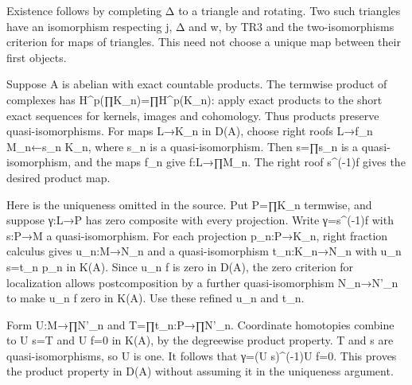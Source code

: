 Existence follows by completing Δ to a triangle and rotating. Two such triangles have an isomorphism respecting j,\allowbreak{} Δ and w,\allowbreak{} by TR3 and the two-isomorphisms criterion for maps of triangles. This need not choose a unique map between their first objects.

Suppose A is abelian with exact countable products. The termwise product of complexes has H\textasciicircum{}p(∏K\_\allowbreak{}n)\allowbreak{}\allowbreak{}=∏H\textasciicircum{}p(K\_\allowbreak{}n)\allowbreak{}:\allowbreak{} apply exact products to the short exact sequences for kernels,\allowbreak{} images and cohomology. Thus products preserve quasi-isomorphisms. For maps L\allowbreak{}→K\_\allowbreak{}n in D(A)\allowbreak{},\allowbreak{} choose right roofs L\allowbreak{}→f\_\allowbreak{}n M\_\allowbreak{}n←s\_\allowbreak{}n K\_\allowbreak{}n,\allowbreak{} where s\_\allowbreak{}n is a quasi-isomorphism. Then s\allowbreak{}=∏s\_\allowbreak{}n is a quasi-isomorphism,\allowbreak{} and the maps f\_\allowbreak{}n give f:\allowbreak{}L\allowbreak{}→∏M\_\allowbreak{}n. The right roof s\textasciicircum{}(-1)\allowbreak{}f gives the desired product map.

Here is the uniqueness omitted in the source. Put P\allowbreak{}=∏K\_\allowbreak{}n termwise,\allowbreak{} and suppose γ:\allowbreak{}L\allowbreak{}→P has zero composite with every projection. Write γ\allowbreak{}=s\textasciicircum{}(-1)\allowbreak{}f with s:\allowbreak{}P\allowbreak{}→M a quasi-isomorphism. For each projection p\_\allowbreak{}n:\allowbreak{}P\allowbreak{}→K\_\allowbreak{}n,\allowbreak{} right fraction calculus gives u\_\allowbreak{}n:\allowbreak{}M\allowbreak{}→N\_\allowbreak{}n and a quasi-isomorphism t\_\allowbreak{}n:\allowbreak{}K\_\allowbreak{}n\allowbreak{}→N\_\allowbreak{}n with u\_\allowbreak{}n s\allowbreak{}=t\_\allowbreak{}n p\_\allowbreak{}n in K(A)\allowbreak{}. Since u\_\allowbreak{}n f is zero in D(A)\allowbreak{},\allowbreak{} the zero criterion for localization allows postcomposition by a further quasi-isomorphism N\_\allowbreak{}n\allowbreak{}→N'\_\allowbreak{}n to make u\_\allowbreak{}n f zero in K(A)\allowbreak{}. Use these refined u\_\allowbreak{}n and t\_\allowbreak{}n.

Form U:\allowbreak{}M\allowbreak{}→∏N'\_\allowbreak{}n and T\allowbreak{}=∏t\_\allowbreak{}n:\allowbreak{}P\allowbreak{}→∏N'\_\allowbreak{}n. Coordinate homotopies combine to U s\allowbreak{}=T and U f\allowbreak{}=0 in K(A)\allowbreak{},\allowbreak{} by the degreewise product property. T and s are quasi-isomorphisms,\allowbreak{} so U is one. It follows that γ\allowbreak{}=(U s)\allowbreak{}\textasciicircum{}(-1)\allowbreak{}U f\allowbreak{}=0. This proves the product property in D(A)\allowbreak{} without assuming it in the uniqueness argument.

